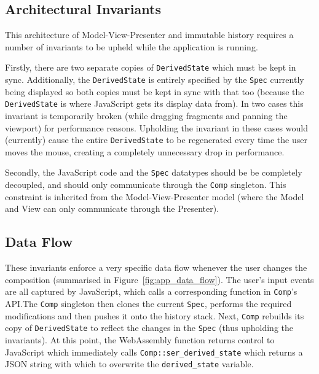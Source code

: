 \documentclass[12pt]{article}
\begin{document}
\subsection{Architectural Invariants}

This architecture of Model-View-Presenter and immutable history requires a number of invariants to
be upheld while the application is running.

Firstly, there are two separate copies of \verb|DerivedState| which must be kept in sync.
Additionally, the \verb|DerivedState| is entirely specified by the \verb|Spec| currently being
displayed so both copies must be kept in sync with that too (because the \verb|DerivedState| is
where JavaScript gets its display data from).  In two cases this invariant is temporarily broken
(while dragging fragments and panning the viewport) for performance reasons.  Upholding the
invariant in these cases would (currently) cause the entire \verb|DerivedState| to be regenerated
every time the user moves the mouse, creating a completely unnecessary drop in performance.

Secondly, the JavaScript code and the \verb|Spec| datatypes should be be completely decoupled, and
should only communicate through the \verb|Comp| singleton.  This constraint is inherited from the
Model-View-Presenter model (where the Model and View can only communicate through the Presenter).

\subsection{Data Flow}

These invariants enforce a very specific data flow whenever the user changes the composition
(summarised in Figure~\ref{fig:app_data_flow}).  The user's input events are all captured by
JavaScript, which calls a corresponding function in \verb|Comp|'s API.\@ The \verb|Comp| singleton
then clones the current \verb|Spec|, performs the required modifications and then pushes it onto the
history stack.  Next, \verb|Comp| rebuilds its copy of \verb|DerivedState| to reflect the changes in
the \verb|Spec| (thus upholding the invariants).  At this point, the WebAssembly function returns
control to JavaScript which immediately calls \verb|Comp::ser_derived_state| which returns a JSON
string with which to overwrite the \verb|derived_state| variable.
\end{document}
